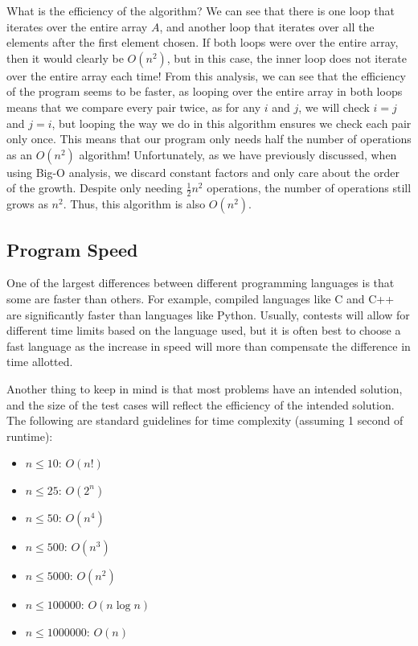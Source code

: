 What is the efficiency of the algorithm?  We can see that there is one loop that iterates over the entire array $ A $, and another loop that iterates over all the elements after the first element chosen.  If both loops were over the entire array, then it would clearly be $ O(n^2) $, but in this case, the inner loop does not iterate over the entire array each time!  From this analysis, we can see that the efficiency of the program seems to be faster, as looping over the entire array in both loops means that we compare every pair twice, as for any $ i $ and $ j $, we will check $ i = j $ and $ j = i $, but looping the way we do in this algorithm ensures we check each pair only once.  This means that our program only needs half the number of operations as an $ O(n^2) $ algorithm!  Unfortunately, as we have previously discussed, when using Big-O analysis, we discard constant factors and only care about the order of the growth.  Despite only needing $ \frac{1}{2}n^2 $ operations, the number of operations still grows as $n^2$.  Thus, this algorithm is also $ O(n^2) $.

\subsection{Program Speed}

One of the largest differences between different programming languages is that some are faster than others.  For example, compiled languages like C and C++ are significantly faster than languages like Python.  Usually, contests will allow for different time limits based on the language used, but it is often best to choose a fast language as the increase in speed will more than compensate the difference in time allotted.

Another thing to keep in mind is that most problems have an intended solution, and the size of the test cases will reflect the efficiency of the intended solution.  The following are standard guidelines for time complexity (assuming 1 second of runtime):

\begin{itemize}
    \item $ n \leq 10$: $ O(n!) $
    \item $ n \leq 25$: $ O(2^n) $
    \item $ n \leq 50$: $ O(n^4) $
    \item $ n \leq 500$: $ O(n^3) $
    \item $ n \leq 5000$: $ O(n^2) $
    \item $ n \leq 100000$: $ O(n\log n) $
    \item $ n \leq 1000000$: $ O(n) $
\end{itemize}

